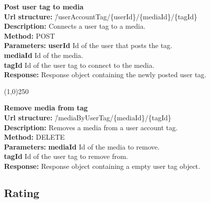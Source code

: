 \documentclass[11pt]{article}
\begin{document}
\begin{tabbing}
\textbf{Post user tag to media} \\
\textcolor{black!60}{\textbf{Url structure:}} \hspace{0.2in} \= /userAccountTag/\{userId\}/\{mediaId\}/\{tagId\} \\
\textcolor{black!60}{\textbf{Description:}}  \> Connects a user tag to a media. \\
\textcolor{black!60}{\textbf{Method:}} \> POST \\
\textcolor{black!60}{\textbf{Parameters:}} \> \textbf{userId} Id of the user that posts the tag. \\
\> \textbf{mediaId} Id of the media. \\
\> \textbf{tagId} Id of the user tag to connect to the media. \\
\textcolor{black!60}{\textbf{Response:}} \> Response object containing the newly posted user tag.
\end{tabbing}

\begin{center}\line(1,0){250}\end{center}

\begin{tabbing}
\textbf{Remove media from tag} \\
\textcolor{black!60}{\textbf{Url structure:}} \hspace{0.2in} \= /mediaByUserTag/\{mediaId\}/\{tagId\} \\
\textcolor{black!60}{\textbf{Description:}}  \> Removes a media from a user account tag.\\
\textcolor{black!60}{\textbf{Method:}} \> DELETE \\
\textcolor{black!60}{\textbf{Parameters:}} \> \textbf{mediaId} Id of the media to remove. \\
\> \textbf{tagId} Id of the user tag to remove from. \\
\textcolor{black!60}{\textbf{Response:}} \> Response object containing a empty user tag object.
\end{tabbing}

\newpage

\subsection{Rating}
\end{document}
